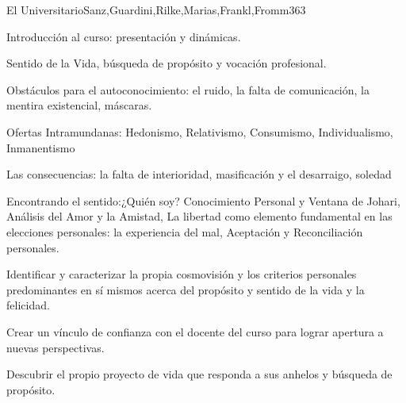 \begin{syllabus}
\begin{unit}{El Universitario}{Sanz,Guardini,Rilke,Marias,Frankl,Fromm}{36}{3}
\begin{topics}
	\item Introducción al curso: presentación y dinámicas.
	\item Sentido de la Vida, búsqueda de propósito y vocación profesional.
	\item Obstáculos para el autoconocimiento: el ruido, la falta de comunicación, la mentira existencial, máscaras.
	\item Ofertas Intramundanas: Hedonismo, Relativismo, Consumismo, Individualismo, Inmanentismo
	\item Las consecuencias: la falta de interioridad, masificación y el desarraigo, soledad
	\item Encontrando el sentido:¿Quién soy? Conocimiento Personal y Ventana de Johari, Análisis del Amor y la Amistad, La libertad como elemento fundamental en las elecciones personales: la experiencia del mal, Aceptación y Reconciliación personales.
\end{topics}
\begin{unitgoals}
	\item Identificar y caracterizar la propia cosmovisión y los criterios personales predominantes en sí mismos acerca del propósito y sentido de la vida y la felicidad.
	\item Crear un vínculo de confianza con el docente del curso para lograr apertura a nuevas perspectivas.
	\item Descubrir el propio proyecto de vida que responda a sus anhelos y búsqueda de propósito.
\end{unitgoals}
\end{unit}


\end{syllabus}
